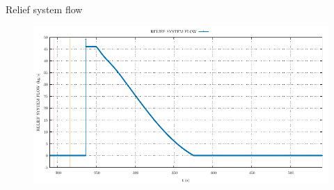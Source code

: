 \begin{frame}{Relief system flow}
	\begin{figure}
		\centering
		\includegraphics[width=\textwidth]{./graphs/RELIEF SYSTEM FLOW_comp.pdf}
		
	\end{figure}
	
\end{frame}

